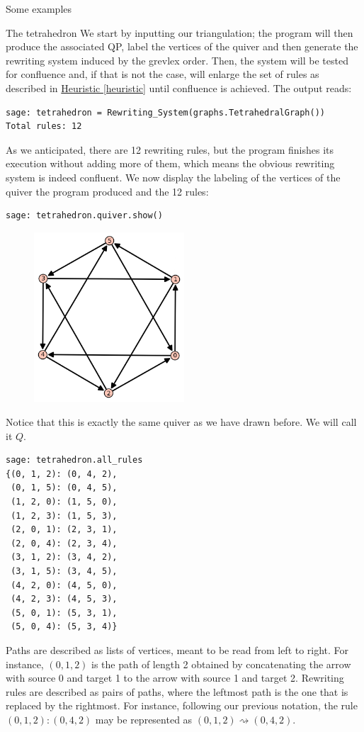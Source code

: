 \begin{chapter}{Some examples}
\begin{section}{The tetrahedron}
We start by inputting our triangulation; the program will then produce the associated QP, label the vertices of the quiver and then generate the rewriting system induced by the grevlex order. Then, the system will be tested for confluence and, if that is not the case, will enlarge the set of rules as described in \hyperref[heuristic]{Heuristic \ref*{heuristic}} until confluence is achieved. The output reads:
\begin{lstlisting}
sage: tetrahedron = Rewriting_System(graphs.TetrahedralGraph())
Total rules: 12
\end{lstlisting}
As we anticipated, there are 12 rewriting rules, but the program finishes its execution without adding more of them, which means the obvious rewriting system is indeed confluent. We now display the labeling of the vertices of the quiver the program produced and the 12 rules:
\begin{lstlisting}
sage: tetrahedron.quiver.show()
\end{lstlisting}
\begin{figure}[h]
\centering
\includegraphics[width=0.5\textwidth]{tetra_quiver.png}
\end{figure}
Notice that this is exactly the same quiver as we have drawn before. We will call it $Q$.
\begin{lstlisting}
sage: tetrahedron.all_rules
{(0, 1, 2): (0, 4, 2),
 (0, 1, 5): (0, 4, 5),
 (1, 2, 0): (1, 5, 0),
 (1, 2, 3): (1, 5, 3),
 (2, 0, 1): (2, 3, 1),
 (2, 0, 4): (2, 3, 4),
 (3, 1, 2): (3, 4, 2),
 (3, 1, 5): (3, 4, 5),
 (4, 2, 0): (4, 5, 0),
 (4, 2, 3): (4, 5, 3),
 (5, 0, 1): (5, 3, 1),
 (5, 0, 4): (5, 3, 4)}
\end{lstlisting}
Paths are described as lists of vertices, meant to be read from left to right. For instance, $(0,1,2)$ is the path of length 2 obtained by concatenating the arrow with source 0 and target 1 to the arrow with source 1 and target 2. Rewriting rules are described as pairs of paths, where the leftmost path is the one that is replaced by the rightmost. For instance, following our previous notation, the rule $(0, 1, 2): (0, 4, 2)$ may be represented as $(0,1,2) \rightsquigarrow (0,4,2)$.


\end{section}
\end{chapter}
